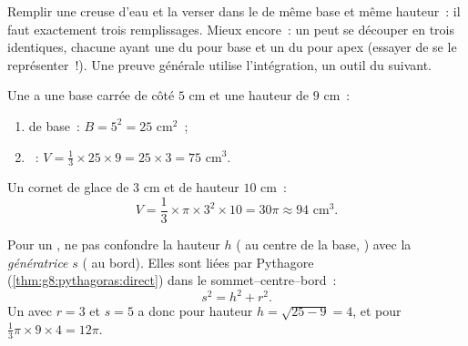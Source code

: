 \begin{remark}
Remplir une  creuse d'eau et la verser dans le  de même
base et même hauteur~: il faut exactement trois remplissages. Mieux
encore~: un  peut se découper en trois  identiques,
chacune ayant une  du  pour base et un  du  pour
apex (essayer de se le représenter~!). Une preuve générale utilise
l'intégration, un outil du  suivant.
\end{remark}

\begin{example}\label{ex:g8:solids:volume}
Une  a une base carrée de côté $5$ cm et une hauteur de
$9$ cm~:
\begin{enumerate}
  \item {} de base~: $B = 5^2 = 25$ cm$^2$~;
  \item {}~: $V = \frac13 \times 25 \times 9 = 25 \times 3 = 75$
        cm$^3$.
\end{enumerate}
Un cornet de glace de  $3$ cm et de hauteur $10$ cm~:
\[
V = \frac13 \times \pi \times 3^2 \times 10 = 30\pi \approx 94
\text{ cm}^3 .
\]
\end{example}

\begin{example}\label{ex:g8:solids:slant}
Pour un , ne pas confondre la hauteur $h$ ( au centre de la
base, ) avec la \emph{génératrice} $s$ ( au
bord). Elles sont liées par Pythagore
(\cref{thm:g8:pythagoras:direct}) dans le 
sommet--centre--bord~:
\[
s^2 = h^2 + r^2 .
\]
Un  avec $r = 3$ et $s = 5$ a donc pour hauteur
$h = \sqrt{25 - 9} = 4$, et pour 
$\frac13 \pi \times 9 \times 4 = 12\pi$.
\end{example}

